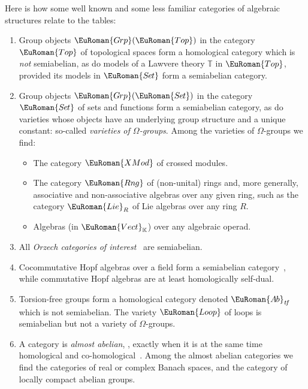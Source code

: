 \documentclass [12pt,oneside]{book}%
\theoremstyle{captionstyle}  %
\newenvironment{ulist}{			%
	\begin{itemize}}{
	\end{itemize}
}
\newcommand{\TT}{\ensuremath{\mathbb{T}}}
\newcommand{\Defn}[1]{\emph{#1}}
\newcommand{\Sets}{\EuRoman{S{\kern-0.12ex}e{\hskip-0.14ex}t}}			                       %
\newcommand{\XMod}{\ensuremath{\EuRoman{XMod}}}
\newcommand{\Grps}{\EuRoman{G{\kern -.15ex}rp}}				%
\newcommand{\Loop}{\EuRoman{Loop}}
\newcommand{\Tops}{\EuRoman{Top}}											%
\newcommand{\AbGrps}{\EuRoman{A{\kern-0.15ex}b}}	%
\newcommand{\Rngs}{\EuRoman{ Rn{\kern-.1ex}g}}                        %
\newcommand{\Lie}{\ensuremath{\EuRoman{Lie}}}
\newcommand{\Vect}{\ensuremath{\EuRoman{Vect}}}
\begin{document}
Here is how some well known and some less familiar categories of algebraic structures relate to the tables:
\begin{enumerate}
    \item Group objects $\Grps(\Tops)$ in the category $\Tops$ of topological spaces form a homological category which is \emph{not} semiabelian, as do models of a Lawvere theory $\TT$ in $\Tops$, provided its models in $\Sets$ form a semiabelian category.
    \item Group objects $\Grps(\Sets)$ in the category $\Sets$ of sets and functions form a semiabelian category, as do varieties whose objects have an underlying group structure and a unique constant: so-called \Defn{varieties of $\Omega$-groups}. Among the varieties of $\Omega$-groups we find:
          \begin{ulist}
              \item The category $\XMod$ of crossed modules.
              \item The category $\Rngs$ of (non-unital) rings and, more generally, associative and non-associative algebras over any given ring, such as the category $\Lie_R$ of Lie algebras over any ring $R$.
              \item Algebras (in $\Vect_\mathbb{K}$) over any algebraic operad.
          \end{ulist}
    \item All \emph{Orzech categories of interest}~\cite{Orzech} are semiabelian.
    \item Cocommutative Hopf algebras over a field form a semiabelian category~\cite{GSV,GKV}, while commutative Hopf algebras are at least homologically self-dual.
    \item Torsion-free groups form a homological category denoted $\AbGrps_{\mathit{tf}}$ which is not semiabelian. The variety $\Loop$ of loops is semiabelian but not a variety of $\Omega$-groups.
    \item A category is \emph{almost abelian}, \cite{Rump0}, exactly when it is at the same time homological and co-homological~\cite{MR2369170}. Among the almost abelian categories we find the categories of real or complex Banach spaces, and the category of locally compact abelian groups.


\end{enumerate}
\end{document}
